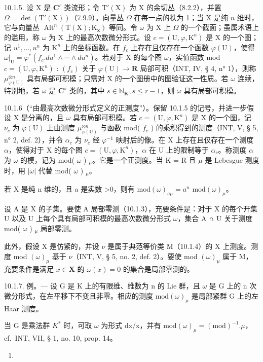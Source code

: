 10.1.5. 设 X 是 \(\mathbf{C}^r\) 类流形；令 \(\mathrm{T}'(\mathrm{X})\) 为 X 的余切丛（8.2.2），并置 \(\Omega = \det(\mathrm{T}'(\mathrm{X}))\)（7.9.9）。向量丛 \(\Omega\) 在每一点的秩为 1；当 X 是纯 \(n\) 维时，它与向量丛 \(\operatorname{Alt}^n(\mathrm{T}(\mathrm{X}); \mathrm{K}_{\mathbf{x}})\) 等同。令 \(\omega\) 为 X 上 \(\Omega\) 的一个截面；虽属术语上的滥用，称 \(\omega\) 为 X 上的最高次数微分形式。设 \(c = (\mathrm{U}, \varphi, \mathrm{K}^n)\) 是 X 的一个图；记 \(u^1, \ldots, u^n\) 为 \(\mathrm{K}^n\) 上的坐标函数。在 \(f_c\) 上存在且仅存在一个函数 \(\varphi(\mathrm{U})\)，使得 \(\omega|_{\mathrm{U}} = \varphi^*(f_c.du^1 \wedge \cdots \wedge du^n)\)。若对于 X 的每个图 \(\omega\)，实值函数 mod \(c = (\mathrm{U}, \varphi, \mathrm{K}^n)\) : \((f_c)\) 关于 \(\varphi(\mathrm{U}) \to \mathbf{R}\) 局部可积（INT, IV, § 4, n° 1），则称 \(\mu_{\varphi(\mathrm{U})}^{\otimes n}\) 具有局部可积模；只需对 X 的一个图册中的图验证这一性质。若 \(\omega\) 连续，特别地，若 \(\omega\) 是 \(\mathbf{C}^s\) 类的，其中 \(s \in \mathbb{N}_{\mathbf{K}}, s \leqslant r - 1\)，则 \(\omega\) 具有局部可积模。

10.1.6（“由最高次数微分形式定义的正测度”）。保留 10.1.5 的记号，并进一步假设 X 是分离的，且 \(\omega\) 具有局部可积模。若 \(c = (\mathrm{U}, \varphi, \mathrm{K}^n)\) 是 X 的一个图，记 \(\nu_c\) 为 \(\varphi(\mathrm{U})\) 上由测度 \(\mu_{\varphi(\mathrm{U})}^{\otimes n}\) 与函数 mod( \(f_c\) ) 的乘积得到的测度（INT, V, § 5, n° 2, def. 2），并令 \(\alpha_c\) 为 \(\nu_c\) 经 \(\varphi^{-1}\) 映射后的像。在 X 上存在且仅存在一个测度 \(\alpha\)，使得对于 X 的每个图 \(c = (\mathrm{U}, \varphi, \mathrm{K}^n)\)，\(\alpha\) 在 U 上的限制等于 \(\alpha_c\)。称测度 \(\alpha\) 为 \(\omega\) 的模，记为 mod( \(\omega\) ) \(_\mu\)。它是一个正测度。当 K = R 且 \(\mu\) 是 Lebesgue 测度时，用 \(|\omega|\) 代替 mod( \(\omega\) ) \(_\mu\)。

若 X 是纯 n 维的，且 a 是实数 \textgreater0，则有 \(\text{mod}(\omega)_{a\mu} = a^{n} \text{ mod}(\omega)_{\mu}\)。

设 A 是 X 的子集。要使 A 局部零测（10.1.3），充要条件是：对于 X 的每个开集 U 以及 U 上每个具有局部可积模的最高次数微分形式 \(\omega\)，集合 A ∩ U 关于测度 mod( \(\omega\) ) \(_{\mu}\) 局部零测。

此外，假设 X 是仿紧的，并设 \(\nu\) 是属于典范等价类 M（10.1.4）的 X 上测度。测度 mod \((\omega)_{\mu}\) 基于 \(\nu\)（INT, V, § 5, no. 2, def. 2）。要使 mod \((\omega)_{\mu}\) 属于 M，充要条件是满足 \(x \in \mathbf{X}\) 的 \(\omega(x) = 0\) 的集合是局部零测的。

10.1.7. 例。--- 设 G 是 K 上的有限维、维数为 n 的 Lie 群，且 \(\omega\) 是 G 上的 n 次微分形式，在左平移下不变且非零。相应的测度 \(\text{mod}(\omega)_{\mu}\) 是局部紧群 G 上的左 Haar 测度。

当 G 是乘法群 \(K^{*}\) 时，可取 \(\omega\) 为形式 dx/x，并有 \(\text{mod}(\omega)_{\mu} = (\text{mod})^{-1}.\mu\)，cf.~INT, VII, § 1, no. 10, prop. 14。
\begin{enumerate}
\def\labelenumi{(\arabic{enumi})}
\setcounter{enumi}{6}
\tightlist
\item
\end{enumerate}
\relax{}
